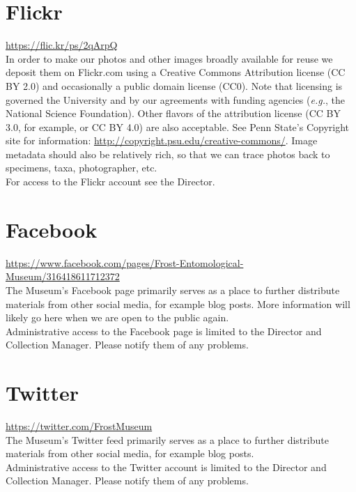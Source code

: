 \documentclass[letterpaper, 11pt]{article}
\begin{document}
\section{Flickr}
\url{https://flic.kr/ps/2qArpQ} \\

\noindent{}In order to make our photos and other images broadly available for reuse we deposit them on Flickr.com using a Creative Commons Attribution license (CC BY 2.0) and occasionally a public domain license (CC0). Note that licensing is governed the University and by our agreements with funding agencies (\textit{e.g.}, the National Science Foundation). Other flavors of the attribution license (CC BY 3.0, for example, or CC BY 4.0) are also acceptable. See Penn State's Copyright site for information: \url{http://copyright.psu.edu/creative-commons/}. Image metadata should also be relatively rich, so that we can trace photos back to specimens, taxa, photographer, etc.\\

\noindent{}For access to the Flickr account see the Director.

\section{Facebook}

\url{https://www.facebook.com/pages/Frost-Entomological-Museum/316418611712372}\\

\noindent{}The Museum's Facebook page primarily serves as a place to further distribute materials from other social media, for example blog posts. More information will likely go here when we are open to the public again.\\

\noindent{}Administrative access to the Facebook page is limited to the Director and Collection Manager. Please notify them of any problems.

\section{Twitter}
\url{https://twitter.com/FrostMuseum}\\

\noindent{}The Museum's Twitter feed primarily serves as a place to further distribute materials from other social media, for example blog posts. \\

\noindent{}Administrative access to the Twitter account is limited to the Director and Collection Manager. Please notify them of any problems.
\end{document}
